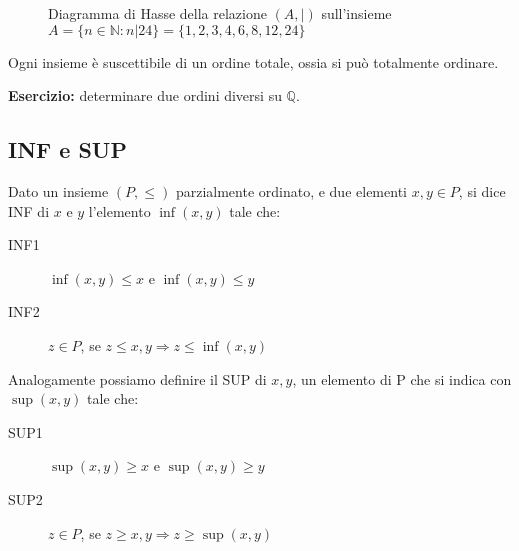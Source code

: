 \begin{figure}[ht]
\centering
{}
\caption{Diagramma di Hasse della relazione $(A,|)$ sull'insieme $A = \{n \in \mathbb{N} : n | 24\} = \{ 1, 2, 3, 4, 6, 8, 12, 24 \} $}
\end{figure}

\begin{theorem}
Ogni insieme \`e suscettibile di un ordine totale, ossia si pu\`o totalmente ordinare.
\end{theorem}

\textbf{Esercizio:} determinare due ordini diversi su $\mathbb{Q}$.

\vspace{5cm}

\subsection{INF e SUP}

\begin{defn}[INF]
Dato un insieme $(P, \leq)$ parzialmente ordinato, e due elementi $x,y \in P$, si dice INF di $x$ e $y$ l'elemento $\inf(x,y)$ tale che:
\begin{description}
    \item[INF1\label{itm:inf1}] $\inf(x,y) \leq x $ e $ \inf(x,y) \leq y$
    \item[INF2\label{itm:inf2}] $z \in P$, se $ z \leq x, y \Rightarrow z \leq \inf(x,y)$
\end{description}
\end{defn}
\begin{defn}[SUP]
Analogamente possiamo definire il SUP di $x,y$, un elemento di P che si indica con $\sup(x,y)$ tale che:
\begin{description}
    \item[SUP1\label{itm:sup1}] $\sup(x,y) \geq x $ e $ \sup(x,y) \geq y$
    \item[SUP2\label{itm:sup2}] $z \in P$, se $ z \geq x, y \Rightarrow z \geq \sup(x,y)$
\end{description}
\end{defn}

